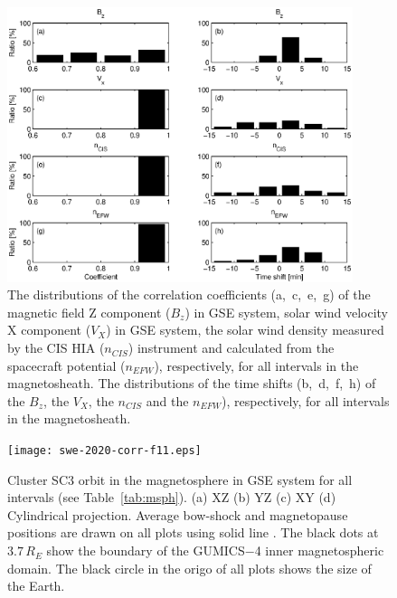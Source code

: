 \documentclass[linenumbers,draft]{agujournal}
\begin{document}
\begin{figure}[h]
\centering
\includegraphics[width=0.9\textwidth,angle=0]{swe-2020-corr-f10.eps}
\caption{The distributions of the correlation coefficients (a,~c,~e,~g) of the magnetic field Z component ($B_z$) in GSE system, solar wind velocity X component ($V_X$) in GSE system, the solar wind density measured by the CIS HIA ($n_{CIS}$) instrument and calculated from the spacecraft potential ($n_{EFW}$), respectively, for all intervals in the magnetosheath. The distributions of the time shifts (b,~d,~f,~h) of the $B_z$, the $V_X$, the $n_{CIS}$ and the $n_{EFW}$), respectively, for all intervals in the magnetosheath.}
\label{fig:mshcorrplot}
\end{figure}

\pagebreak

\begin{figure}[h]
\centering
\texttt{[image: swe-2020-corr-f11.eps]}  
\caption{Cluster SC3 orbit in the magnetosphere in GSE system for all intervals (see Table~\ref{tab:msph}). (a) XZ (b) YZ (c) XY (d) Cylindrical projection. Average bow-shock and magnetopause positions are drawn on all plots using solid line \citep[][respectively]{peredo95:_three_alfven_mach,tsyganenko95:_model_earth}. The black dots at $3.7\,R_E$ show the boundary of the GUMICS$-$4 inner magnetospheric domain. The black circle in the origo of all plots shows the size of the Earth.}
\label{fig:msphorbit}
\end{figure}

\pagebreak
\end{document}
